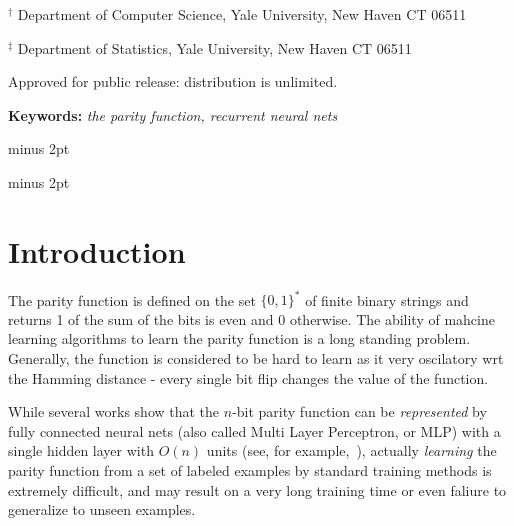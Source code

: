 \documentclass[fleqn,11pt]{article}
\begin{document}
{\begin{titlepage}
\begin{center}
          \end{center}



\vfill


\vspace{2mm}

\noindent
$\mbox{}^{\dagger}$ Department of Computer Science, Yale University, New Haven CT 06511

\noindent
$\mbox{}^{\ddagger}$ Department of Statistics, Yale University, New Haven CT 06511

\vspace{5mm}

\noindent
Approved for public release: distribution is unlimited.

\noindent
{\bf Keywords:}
{\it the parity function, recurrent neural nets }



\baselineskip   21pt minus 2pt


\vspace{0.2in}


\baselineskip   21pt minus 2pt


\end{titlepage}






\section{Introduction} \label{sec:intro}
The parity function is defined on the set $\{0,1\}^*$ of finite binary strings and returns 1 of the sum of the bits is even and 0 otherwise. The ability of mahcine learning algorithms to learn the parity function is a long standing problem. Generally, the function is considered to be hard to learn as it very oscilatory wrt the Hamming distance - every single bit flip changes the value of the function.

While several works show that the $n$-bit parity function can be \textit{represented} by fully connected neural nets  (also called Multi Layer Perceptron, or MLP) with a single hidden layer with $O(n)$ units (see, for example,~\cite{wilamowski2003solving, setiono1997solution, franco2001generalization}), actually \textit{learning} the parity function from a set of labeled examples by standard training methods is extremely difficult, and may result on a very long training time or even faliure to generalize to unseen examples. 

}
\end{document}
